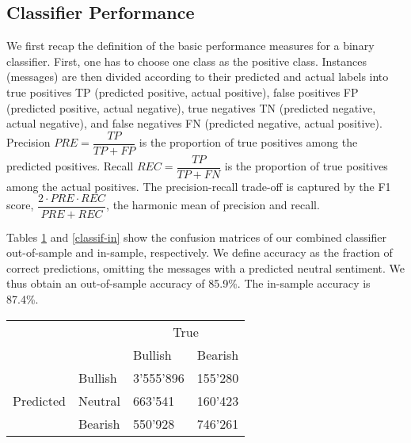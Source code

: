 %






\clearpage
\subsection{Classifier Performance}\label{app_class}


We first recap the definition of the basic performance measures for a binary classifier. First, one has to choose one class as the positive class. Instances (messages) are then divided according to their predicted and actual labels into true positives TP (predicted positive, actual positive), false positives FP (predicted positive, actual negative), true negatives TN (predicted negative, actual negative), and false negatives FN (predicted negative, actual positive). Precision $PRE=\dfrac{TP}{TP+FP}$ is the proportion of true positives among the predicted positives. Recall $REC = \dfrac{TP}{TP+FN}$ is the proportion of true positives among the actual positives. The precision-recall trade-off is captured by the F1 score, $\dfrac{2 \cdot PRE \cdot REC}{PRE + REC}$, the harmonic mean of precision and recall.  

Tables \ref{classif-out} and \ref{classif-in} show the confusion matrices of our combined classifier out-of-sample and in-sample, respectively. We define accuracy as the fraction of correct predictions, omitting the messages with a predicted neutral sentiment. We thus obtain an out-of-sample accuracy of 85.9\%. The in-sample accuracy is 87.4\%. 
 

\begin{table}[H]
\centering
\begin{tabular}{cl|ll|}
\cline{3-4}
\multicolumn{1}{l}{}                        &         & \multicolumn{2}{c|}{True}               \\ \cline{3-4}
\multicolumn{1}{l}{}                        &         & \multicolumn{1}{l|}{Bullish} & Bearish  \\ \cline{1-4}
\multicolumn{1}{|c|}{\multirow{3}{*}{Predicted}} & Bullish & 3'555'896                      & 155'280   \\ \cline{2-2}
\multicolumn{1}{|c|}{}                      & Neutral & 663'541                       & 160'423    \\ \cline{2-2}
\multicolumn{1}{|c|}{}                      & Bearish & 550'928                       & 746'261  \\ \cline{1-4}
\end{tabular}
\label{classif-out}
\end{table}

